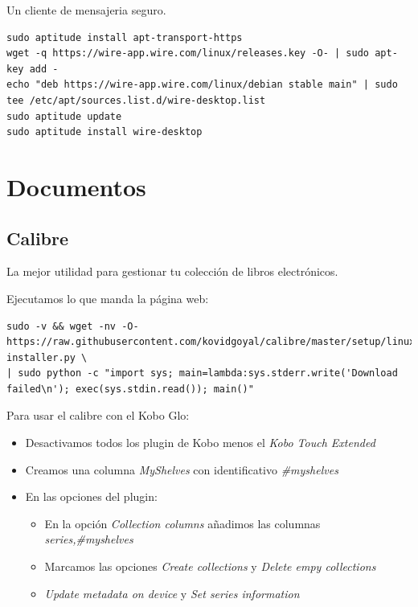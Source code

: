 \documentclass[12pt,spanish,]{scrartcl}
\providecommand{\tightlist}{%
  \setlength{\itemsep}{0pt}\setlength{\parskip}{0pt}}
\begin{document}
Un cliente de mensajeria seguro.

\begin{verbatim}
sudo aptitude install apt-transport-https
wget -q https://wire-app.wire.com/linux/releases.key -O- | sudo apt-key add -
echo "deb https://wire-app.wire.com/linux/debian stable main" | sudo tee /etc/apt/sources.list.d/wire-desktop.list
sudo aptitude update
sudo aptitude install wire-desktop
\end{verbatim}

\section{Documentos}\label{documentos}

\subsection{Calibre}\label{calibre}

La mejor utilidad para gestionar tu colección de libros electrónicos.

Ejecutamos lo que manda la página web:

\begin{verbatim}
sudo -v && wget -nv -O- https://raw.githubusercontent.com/kovidgoyal/calibre/master/setup/linux-installer.py \
| sudo python -c "import sys; main=lambda:sys.stderr.write('Download failed\n'); exec(sys.stdin.read()); main()"
\end{verbatim}

Para usar el calibre con el Kobo Glo:

\begin{itemize}
\item
  Desactivamos todos los plugin de Kobo menos el \emph{Kobo Touch
  Extended}
\item
  Creamos una columna \emph{MyShelves} con identificativo
  \emph{\#myshelves}
\item
  En las opciones del plugin:

  \begin{itemize}
  \tightlist
  \item
    En la opción \emph{Collection columns} añadimos las columnas
    \emph{series,\#myshelves}
  \item
    Marcamos las opciones \emph{Create collections} y \emph{Delete empy
    collections}
  \item
    \emph{Update metadata on device} y \emph{Set series information}
  \end{itemize}
\end{itemize}
\end{document}
